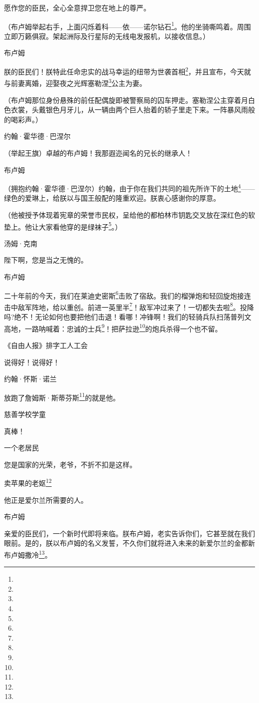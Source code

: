 \par 愿作您的臣民，全心全意捍卫您在地上的尊严。
\par （布卢姆举起右手，上面闪烁着科——依——诺尔钻石\footnote{}。他的坐骑嘶鸣着。周围立即万籁俱寂。架起洲际及行星际的无线电发报机，以接收信息。）
\par 布卢姆
\par 朕的臣民们！朕特此任命忠实的战马幸运的纽带为世袭首相\footnote{}，并且宣布，今天就与前妻离婚，迎娶夜之光辉塞勒涅\footnote{}公主为妻。
\par （布卢姆那位身份悬殊的前任配偶旋即被警察局的囚车押走。塞勒涅公主穿着月白色衣裳，头戴银色月牙儿，从一辆由两个巨人抬着的轿子里走下来。一阵暴风雨般的喝彩声。）
\par 约翰·霍华德·巴涅尔
\par （举起王旗）卓越的布卢姆！我那遐迩闻名的兄长的继承人！
\par 布卢姆
\par （拥抱约翰·霍华德·巴涅尔）约翰，由于你在我们共同的祖先所许下的土地\footnote{}——绿色的爱琳上，给朕以与国王般配的隆重欢迎。朕衷心感谢你的厚意。
\par （他被授予体现着宪章的荣誉市民权，呈给他的都柏林市钥匙交叉放在深红色的软垫上。他让大家看他穿的是绿袜子\footnote{}。）
\par 汤姆·克南
\par 陛下啊，您是当之无愧的。
\par 布卢姆
\par 二十年前的今天，我们在莱迪史密斯\footnote{}击败了宿敌。我们的榴弹炮和轻回旋炮接连击中敌军阵地，给以重创。前进一英里半\footnote{}！敌军冲过来了！一切都失去啦\footnote{}。投降吗?绝不！无论如何也要把他们击退！看哪！冲锋啊！我们的轻骑兵队扫荡普列文高地，一路呐喊着：忠诚的士兵\footnote{}！把萨拉逊\footnote{}的炮兵杀得一个也不留。
\par 《自由人报》排字工人工会
\par 说得好！说得好！
\par 约翰·怀斯·诺兰
\par 放跑了詹姆斯·斯蒂芬斯\footnote{}的就是他。
\par 慈善学校学童
\par 真棒！
\par 一个老居民
\par 您是国家的光荣，老爷，不折不扣是这样。
\par 卖苹果的老妪\footnote{}
\par 他正是爱尔兰所需要的人。
\par 布卢姆
\par 亲爱的臣民们，一个新时代即将来临。朕布卢姆，老实告诉你们，它甚至就在我们眼前。是的，朕以布卢姆的名义发誓，不久你们就将进入未来的新爱尔兰的金都新布卢姆撒冷\footnote{}。
